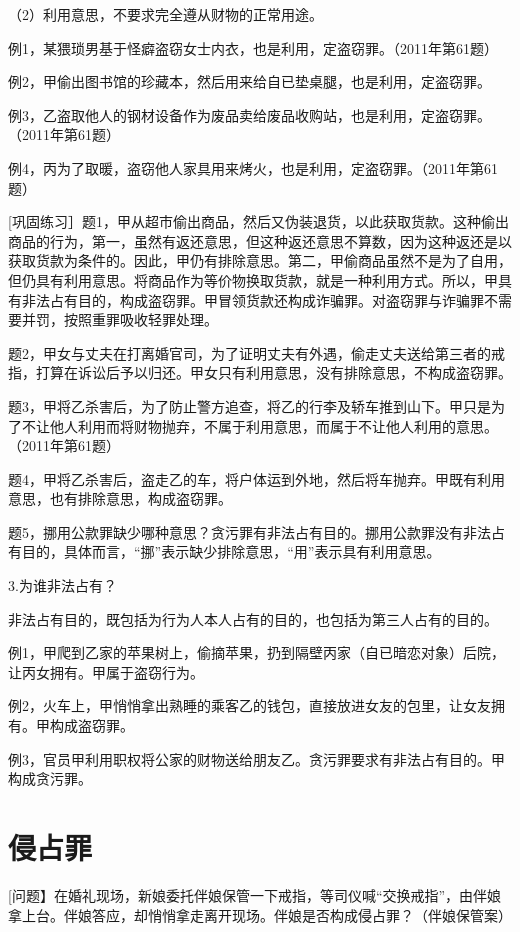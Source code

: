 （2）利用意思，不要求完全遵从财物的正常用途。

例1，某猥琐男基于怪癖盗窃女士内衣，也是利用，定盗窃罪。（2011年第61题）

例2，甲偷出图书馆的珍藏本，然后用来给自已垫桌腿，也是利用，定盗窃罪。

例3，乙盗取他人的钢材设备作为废品卖给废品收购站，也是利用，定盗窃罪。（2011年第61题）

例4，丙为了取暖，盗窃他人家具用来烤火，也是利用，定盗窃罪。（2011年第61题）

[巩固练习］题1，甲从超市偷出商品，然后又伪装退货，以此获取货款。这种偷出商品的行为，第一，虽然有返还意思，但这种返还意思不算数，因为这种返还是以获取货款为条件的。因此，甲仍有排除意思。第二，甲偷商品虽然不是为了自用，但仍具有利用意思。将商品作为等价物换取货款，就是一种利用方式。所以，甲具有非法占有目的，构成盗窃罪。甲冒领货款还构成诈骗罪。对盗窃罪与诈骗罪不需要并罚，按照重罪吸收轻罪处理。

题2，甲女与丈夫在打离婚官司，为了证明丈夫有外遇，偷走丈夫送给第三者的戒指，打算在诉讼后予以归还。甲女只有利用意思，没有排除意思，不构成盗窃罪。

题3，甲将乙杀害后，为了防止警方追查，将乙的行李及轿车推到山下。甲只是为了不让他人利用而将财物抛弃，不属于利用意思，而属于不让他人利用的意思。（2011年第61题）

题4，甲将乙杀害后，盗走乙的车，将户体运到外地，然后将车抛弃。甲既有利用意思，也有排除意思，构成盗窃罪。

题5，挪用公款罪缺少哪种意思？贪污罪有非法占有目的。挪用公款罪没有非法占有目的，具体而言，“挪”表示缺少排除意思，“用”表示具有利用意思。

3.为谁非法占有？

非法占有目的，既包括为行为人本人占有的目的，也包括为第三人占有的目的。

例1，甲爬到乙家的苹果树上，偷摘苹果，扔到隔壁丙家（自已暗恋对象）后院，让丙女拥有。甲属于盗窃行为。

例2，火车上，甲悄悄拿出熟睡的乘客乙的钱包，直接放进女友的包里，让女友拥有。甲构成盗窃罪。

例3，官员甲利用职权将公家的财物送给朋友乙。贪污罪要求有非法占有目的。甲构成贪污罪。

\section{侵占罪}

[问题】在婚礼现场，新娘委托伴娘保管一下戒指，等司仪喊“交换戒指”，由伴娘拿上台。伴娘答应，却悄悄拿走离开现场。伴娘是否构成侵占罪？（伴娘保管案）


